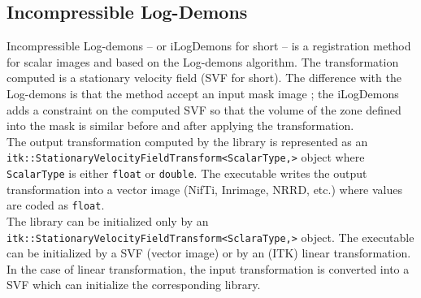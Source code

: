 \subsection{Incompressible Log-Demons}

Incompressible Log-demons -- or iLogDemons for short -- is a registration method for scalar images and based on the Log-demons algorithm. The transformation computed is a stationary velocity field (SVF for short). The difference with the Log-demons is that the method accept an input mask image ; the iLogDemons adds a constraint on the computed SVF so that the volume of the zone defined into the mask is similar before and after applying the transformation.
\\
 The output transformation computed by the library is represented as an \texttt{itk::\-Stationary\-Velocity\-Field\-Transform\-<ScalarType,>} object where \texttt{ScalarType} is either \texttt{float} or \texttt{double}. The executable writes the output transformation into a vector image (NifTi, Inrimage, NRRD, etc.) where values are coded as \texttt{float}.
\\
The library can be initialized only by an \texttt{itk::\-Stationary\-Velocity\-Field\-Transform\-<SclaraType,>} object. The executable can be initialized by a SVF (vector image) or by an (ITK) linear transformation. In the case of linear transformation, the input transformation is converted into a SVF which can initialize the corresponding library.